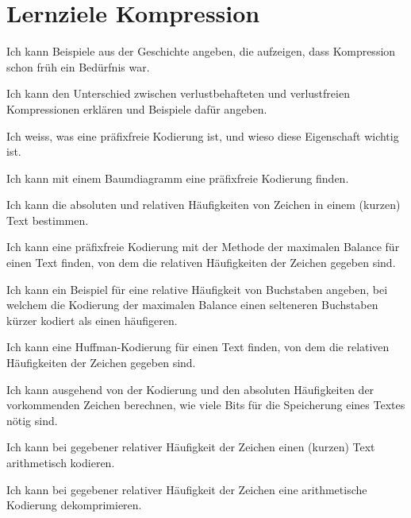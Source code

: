 \chapter{Lernziele Kompression}
\begin{todolist}
\item Ich kann Beispiele aus der Geschichte angeben, die aufzeigen, dass Kompression schon früh ein Bedürfnis war.
\item Ich kann den Unterschied zwischen verlustbehafteten und verlustfreien Kompressionen erklären und Beispiele dafür angeben.
\item Ich weiss, was eine präfixfreie Kodierung ist, und wieso diese Eigenschaft wichtig ist.
\item Ich kann mit einem Baumdiagramm eine präfixfreie Kodierung finden.
\item Ich kann die absoluten und relativen Häufigkeiten von Zeichen in einem (kurzen) Text bestimmen.
\item Ich kann eine präfixfreie Kodierung mit der Methode der maximalen Balance für einen Text finden, von dem die relativen Häufigkeiten der Zeichen gegeben sind.
\item Ich kann ein Beispiel für eine relative Häufigkeit von Buchstaben angeben, bei welchem die Kodierung der maximalen Balance einen selteneren Buchstaben kürzer kodiert als einen häufigeren.
\item Ich kann eine Huffman-Kodierung für einen Text finden, von dem die relativen Häufigkeiten der Zeichen gegeben sind.
\item Ich kann ausgehend von der Kodierung und den absoluten Häufigkeiten der vorkommenden Zeichen berechnen, wie viele Bits für die Speicherung eines Textes nötig sind.
\item Ich kann bei gegebener relativer Häufigkeit der Zeichen einen (kurzen) Text arithmetisch kodieren.
\item Ich kann bei gegebener relativer Häufigkeit der Zeichen eine arithmetische Kodierung dekomprimieren.
\end{todolist}